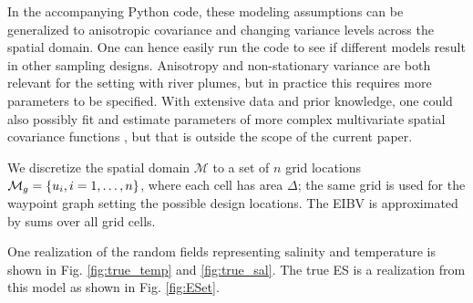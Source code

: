 \documentclass[aoas]{imsart}
\begin{document}
In the accompanying Python code, these modeling assumptions can be generalized to anisotropic covariance and changing variance levels across the spatial domain. One can hence easily run the code to see if different models result in other sampling designs. Anisotropy and non-stationary variance are both relevant for the setting with river plumes, but in practice this requires more parameters to be specified. With extensive data and prior knowledge, one could also possibly fit and estimate parameters of more complex multivariate spatial covariance functions
\citep{gneiting2010matern,genton2015cross}, but that is outside the scope of the current paper.

We discretize the spatial domain $\mathcal{M}$ to a set of $n$ grid
locations $\mathcal{M}_g = \{u_i, i=1,\ldots,n \}$, where each cell
has area $\Delta$; the same grid is used for the waypoint graph setting the
possible design locations. The EIBV is approximated by sums over all grid cells. 

One realization of the random fields representing salinity and
temperature is shown in Fig. \ref{fig:true_temp} and
\ref{fig:true_sal}. The true ES is a realization from this model as shown
in Fig. \ref{fig:ESet}.
\end{document}
